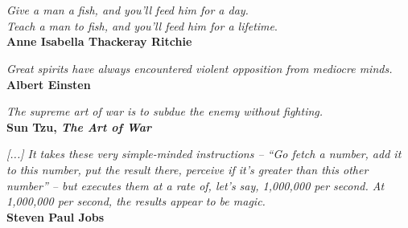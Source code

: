 \section*{}

\begin{flushright}
\textit{Give a man a fish, and you'll feed him for a day.\\
Teach a man to fish, and you'll feed him for a lifetime}.\\
\textbf{Anne Isabella Thackeray Ritchie}

\vspace{0.5cm}

\textit{Great spirits have always encountered violent opposition from mediocre minds.}\\
\textbf{Albert Einsten}

\vspace{0.5cm}

\textit{The supreme art of war is to subdue the enemy without fighting.}\\
\textbf{Sun Tzu, \emph{The Art of War}}

\vspace{0.5cm}

\textit{[...] It takes these very simple-minded instructions -- ``Go fetch a number, add it to this number, put the result there, perceive if it's greater than this other number'' -- but executes them at a rate of, let's say, 1,000,000 per second. At 1,000,000 per second, the results appear to be magic.}\\
\textbf{Steven Paul Jobs}
\end{flushright}
